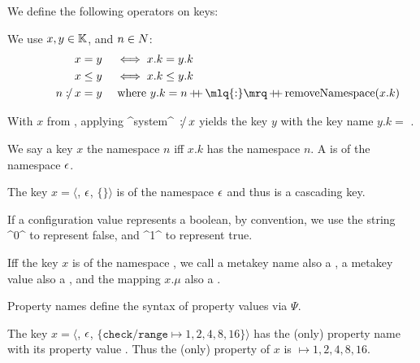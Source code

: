 We define the following operators on keys:

\begin{definition}
We use $x, y \in \mathbb{K}$, and $n \in \mathnormal{N}$:
\begin{align*}
\phantom{juhuuuuu}             x = y & \quad \iff x.k=y.k \\
                            x \leq y & \quad \iff x.k \leq y.k \\
                  n \concatkey x = y & \quad \text{ where } y.k = n \concat \mlq{:}\mrq \concat \text{removeNamespace} (x.k)
\end{align*}
\end{definition}

\begin{example}
With $x$ from , applying ^system^ $\operatorname*{\mathnormal{\colon\!\!\!/}} x$ yields the key $y$ with the key name $y.k =$ .
\end{example}

\begin{definition}
We say a key $x$  the namespace $n$ iff $x.k$ has the namespace $n$.
A  is of the namespace $\epsilon$.
\end{definition}

\begin{example}
The key $x = \langle$, $\epsilon$, $\{ \}\rangle$ is of the namespace $\epsilon$ and thus is a cascading key.
\end{example}

If a configuration value represents a boolean, by convention, we use the string ^0^ to represent false, and ^1^ to represent true.

\begin{definition}
\label{def:property}
Iff the key $x$ is of the namespace , we call a metakey name also a , a metakey value also a , and the mapping $x.\mu$ also a .
\end{definition}

Property names define the syntax of property values via $\Psi$.

\begin{example}
The key $x = \langle$, $\epsilon$, $\{\texttt{check/}$\linebreak$\texttt{range} \mapsto 1,2,4,8,16 \}\rangle$ has the (only) property name  with its property value .
Thus the (only) property of $x$ is  $\mapsto 1,2,4,8,16$.
\end{example}



